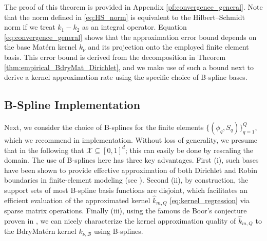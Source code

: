 \documentclass[aos,preprint]{imsart}
\theoremstyle{plain}
\DeclareMathOperator{\E}{\mathbb E}
\newcommand{\Real}{\mathbb R}
\newcommand{\BB}{\bold B}
\theoremstyle{remark}
\begin{document}
\noindent The proof of this theorem is provided in Appendix \ref{pf:convergence_general}. Note that the norm defined in \eqref{eq:HS_norm} is equivalent to the Hilbert–Schmidt norm if we treat $k_1-k_2$ as an integral operator. Equation \eqref{eq:convergence_general} shows that the approximation error bound depends on the base Mat\'ern kernel $k_{\nu}$ and its projection onto the employed finite element basis. This error bound is derived from the decomposition in Theorem \ref{thm:empirical_BdryMat_Dirichlet}, and we make use of such a bound next to derive a kernel approximation rate using the specific choice of B-spline bases.

\subsection{B-Spline Implementation}
\label{sec:Bspline}
Next, we consider the choice of B-splines \cite{hollig2003finite} for the finite elements $\{(\phi_q,S_q)\}_{q=1}^Q$, which we recommend in implementation. Without loss of generality, we presume that in the following that $\mathcal{X} \subseteq [0,1]^d$; this can easily be done by rescaling the domain. The use of B-splines here has three key advantages. First (i), such bases have been shown to provide effective approximation of both Dirichlet and Robin boundaries in finite-element modeling (see \cite{shu2012differential}). Second (ii), by construction, the support sets of most B-spline basis functions are disjoint, which facilitates an efficient evaluation of the approximated kernel $\hat{k}_{m,Q}$ \eqref{eq:kernel_regression} via sparse matrix operations. Finally (iii), using the famous de Boor's conjecture proven in \cite{shadrin2001norm}, we can nicely characterize the kernel approximation quality of $\hat{k}_{m,Q}$ to the BdryMat\'ern kernel ${k}_{\nu,\mathcal{B}}$ using B-splines.
\end{document}
